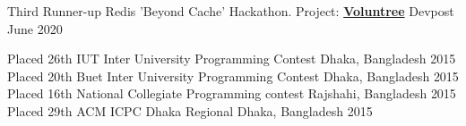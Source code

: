 \begin{cvhonors}
  \cvhonor
    {Third Runner-up}
    {Redis 'Beyond Cache' Hackathon. Project: \href{https://devpost.com/software/voluntree-3uwf9h}{\bodyfont\bfseries{Voluntree}}}
    {Devpost}
    {June 2020}
\end{cvhonors}

\begin{cvhonors}
  \cvhonor
    {Placed 26th}
    {IUT Inter University Programming Contest}
    {Dhaka, Bangladesh}
    {2015}
  \cvhonor
    {Placed 20th}
    {Buet Inter University Programming Contest}
    {Dhaka, Bangladesh}
    {2015}
  \cvhonor
    {Placed 16th}
    {National Collegiate Programming contest}
    {Rajshahi, Bangladesh}
    {2015}
  \cvhonor
    {Placed 29th}
    {ACM ICPC Dhaka Regional}
    {Dhaka, Bangladesh}
    {2015}
\end{cvhonors}

  \vspace{-8mm}
  \begin{cvitems}
    \item { }
    \item { }
    \item { }
    \item { }
  \end{cvitems}
